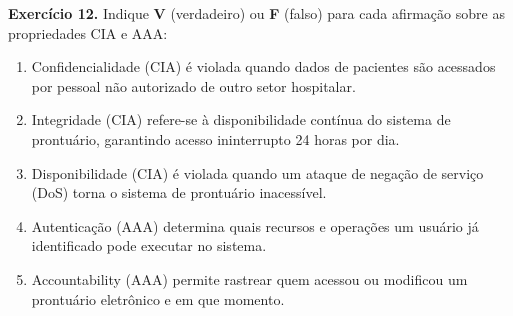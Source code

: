 \documentclass[12pt,a4paper]{article}
\newif\ifgabarito
\newcommand{\questao}[2][8]{%
  \needspace{#1\baselineskip}%
  \noindent\textbf{Exercício #2.}%
}
\begin{document}
\ifgabarito
\begin{tcolorbox}[gabarito]
\textit{Hazard}: condição do sistema ou ambiente que pode levar a um acidente (dano físico). Diferente de \textit{failure}: um hazard pode existir sem causar acidente se as condições não se combinarem; uma failure é o serviço incorreto entregue.
\begin{enumerate}[label=\alph*),nosep]
  \item (i)~Perda de sinal GPS em área urbana; (ii)~Falha no sensor de altitude.
  \item SC(i): o drone não deve voar acima da altitude máxima sem confirmação de altitude válida; SC(ii): em caso de leitura de altitude inconsistente, iniciar procedimento de pouso de emergência imediatamente.
  \item Mit.(i): fusão de GPS + inercial (IMU) com detecção automática de falha de GPS; Mit.(ii): dois sensores de altitude independentes com votação majoritária (2-of-3 voting).
\end{enumerate}
\end{tcolorbox}
\fi

\vspace{8pt}

\questao[11]{12} Indique \textbf{V} (verdadeiro) ou \textbf{F} (falso) para cada afirmação sobre as propriedades CIA e AAA:
\begin{enumerate}[label=\upshape(\hspace{0.7em})]
  \item Confidencialidade (CIA) é violada quando dados de pacientes são acessados por pessoal não autorizado de outro setor hospitalar.
  \item Integridade (CIA) refere-se à disponibilidade contínua do sistema de prontuário, garantindo acesso ininterrupto 24 horas por dia.
  \item Disponibilidade (CIA) é violada quando um ataque de negação de serviço (DoS) torna o sistema de prontuário inacessível.
  \item Autenticação (AAA) determina quais recursos e operações um usuário já identificado pode executar no sistema.
  \item Accountability (AAA) permite rastrear quem acessou ou modificou um prontuário eletrônico e em que momento.
\end{enumerate}

\ifgabarito
\begin{tcolorbox}[gabarito]
(1)~\textbf{V} \quad (2)~\textbf{F} \quad (3)~\textbf{V} \quad (4)~\textbf{F} \quad (5)~\textbf{V}

\smallskip
(2)~\textbf{Integridade} garante que os dados não foram alterados indevidamente; disponibilidade contínua é a propriedade \textit{Availability}.
(4)~\textbf{Autenticação} verifica \textit{quem} é o usuário; \textit{Autorização} (não autenticação) define o que o usuário autenticado pode acessar.
\end{tcolorbox}
\fi
\end{document}

